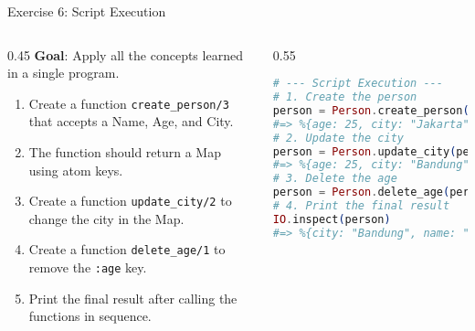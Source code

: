 \documentclass[aspectratio=169, table]{beamer}
\begin{document}
\begin{frame}[fragile]{Exercise 6: Script Execution}
\vspace{15pt}
\begin{columns}
    \begin{column}[T]{0.45\textwidth}
        \textbf{Goal}: Apply all the concepts learned in a single program.
        \begin{enumerate}
            \item Create a function \texttt{create\_person/3} that accepts a Name, Age, and City.
            \item The function should return a Map using atom keys.
            \item Create a function \texttt{update\_city/2} to change the city in the Map.
            \item Create a function \texttt{delete\_age/1} to remove the \texttt{:age} key.
            \item Print the final result after calling the functions in sequence.
        \end{enumerate}

    \end{column}

    \begin{column}[T]{0.55\textwidth}
        \begin{lstlisting}[language=Elixir, basicstyle=\ttfamily\footnotesize]
# --- Script Execution ---
# 1. Create the person
person = Person.create_person("Budi", 25, "Jakarta")
#=> %{age: 25, city: "Jakarta", name: "Budi"}
# 2. Update the city
person = Person.update_city(person, "Bandung")
#=> %{age: 25, city: "Bandung", name: "Budi"}
# 3. Delete the age
person = Person.delete_age(person)
# 4. Print the final result
IO.inspect(person)
#=> %{city: "Bandung", name: "Budi"}
        \end{lstlisting}
    \end{column}
\end{columns}
\end{frame}
\end{document}

